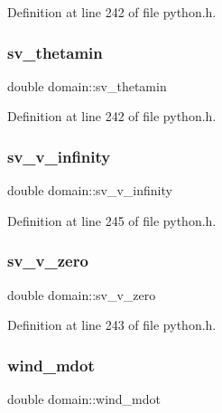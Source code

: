 Definition at line 242 of file python.\+h.

\mbox{\label{structdomain_a2306719a5ca44d8a9583068bc2364779}} 
\subsubsection{\texorpdfstring{sv\+\_\+thetamin}{sv\_thetamin}}
{\footnotesize\ttfamily double domain\+::sv\+\_\+thetamin}



Definition at line 242 of file python.\+h.

\mbox{\label{structdomain_aae554cbed4fcece39952775d283b9dac}} 
\subsubsection{\texorpdfstring{sv\+\_\+v\+\_\+infinity}{sv\_v\_infinity}}
{\footnotesize\ttfamily double domain\+::sv\+\_\+v\+\_\+infinity}



Definition at line 245 of file python.\+h.

\mbox{\label{structdomain_ad63ff34e9cf3ccee5dcb2d421f20c451}} 
\subsubsection{\texorpdfstring{sv\+\_\+v\+\_\+zero}{sv\_v\_zero}}
{\footnotesize\ttfamily double domain\+::sv\+\_\+v\+\_\+zero}



Definition at line 243 of file python.\+h.

\mbox{\label{structdomain_a18728816b23e527c44c331b611a726f4}} 
\subsubsection{\texorpdfstring{wind\+\_\+mdot}{wind\_mdot}}
{\footnotesize\ttfamily double domain\+::wind\+\_\+mdot}



